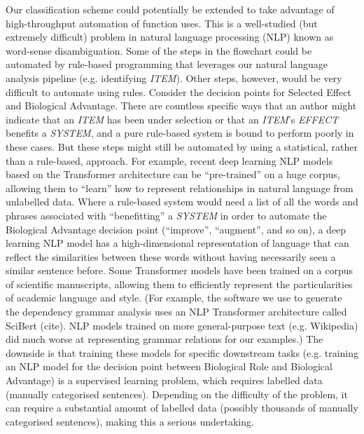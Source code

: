 \documentclass{article}
\begin{document}
Our classification scheme could potentially be extended to take advantage of high-throughput automation of function uses.
This is a well-studied (but extremely difficult) problem in natural language processing (NLP) known as word-sense disambiguation.
Some of the steps in the flowchart could be automated by rule-based programming that leverages our natural language analysis pipeline (e.g. identifying \emph{ITEM}).
Other steps, however, would be very difficult to automate using rules.
Consider the decision points for Selected Effect and Biological Advantage.
There are countless specific ways that an author might indicate that an \emph{ITEM} has been under selection or that an \emph{ITEM}'s \emph{EFFECT} benefits a \emph{SYSTEM}, and a pure rule-based system is bound to perform poorly in these cases.
But these steps might still be automated by using a statistical, rather than a rule-based, approach.
For example, recent deep learning NLP models based on the Transformer architecture can be ``pre-trained'' on a huge corpus, allowing them to ``learn'' how to represent relationships in natural language from unlabelled data.
Where a rule-based system would need a list of all the words and phrases associated with ``benefitting'' a \emph{SYSTEM} in order to automate the Biological Advantage decision point (``improve'', ``augment'', and so on), a deep learning NLP model has a high-dimensional representation of language that can reflect the similarities between these words without having necessarily seen a similar sentence before.
Some Transformer models have been trained on a corpus of scientific manuscripts, allowing them to efficiently represent the particularities of academic language and style.
(For example, the software we use to generate the dependency grammar analysis uses an NLP Transformer architecture called SciBert (cite). NLP models trained on more general-purpose text (e.g. Wikipedia) did much worse at representing grammar relations for our examples.)
The downside is that training these models for specific downstream tasks (e.g. training an NLP model for the decision point between Biological Role and Biological Advantage) is a supervised learning problem, which requires labelled data (manually categorised sentences).
Depending on the difficulty of the problem, it can require a substantial amount of labelled data (possibly thousands of manually categorised sentences), making this a serious undertaking.
\end{document}
